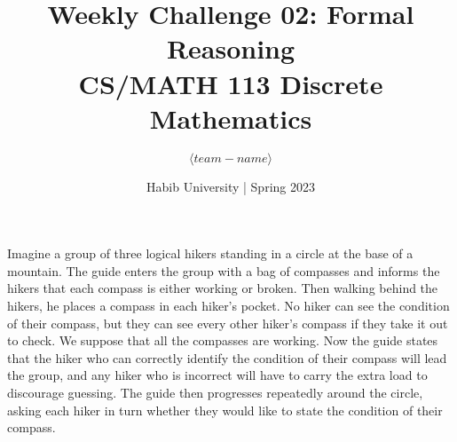 \documentclass[a4paper]{exam}
\title{Weekly Challenge 02: Formal Reasoning\\CS/MATH 113 Discrete Mathematics}
\author{$\langle team-name \rangle$}  %
\date{Habib University | Spring 2023}
\begin{document}
\maketitle

\begin{questions}
  
Imagine a group of three logical hikers standing in a circle at the base of a mountain. The guide enters the group with a bag of compasses and informs the 
hikers that each compass is either working or broken. Then walking behind the hikers, he places a compass in each hiker's pocket. No hiker can see the 
condition of their compass, but they can see every other hiker's compass if they take it out to check. We suppose that all the compasses are working. 
Now the guide states that the hiker who can correctly identify the condition of their compass will lead the group, and any hiker who is incorrect will 
have to carry the extra load to discourage guessing. The guide then progresses repeatedly around the circle, asking each hiker in turn whether they would 
like to state the condition of their compass.



\begin{solution}
  \end{solution}
\end{questions}
\end{document}
